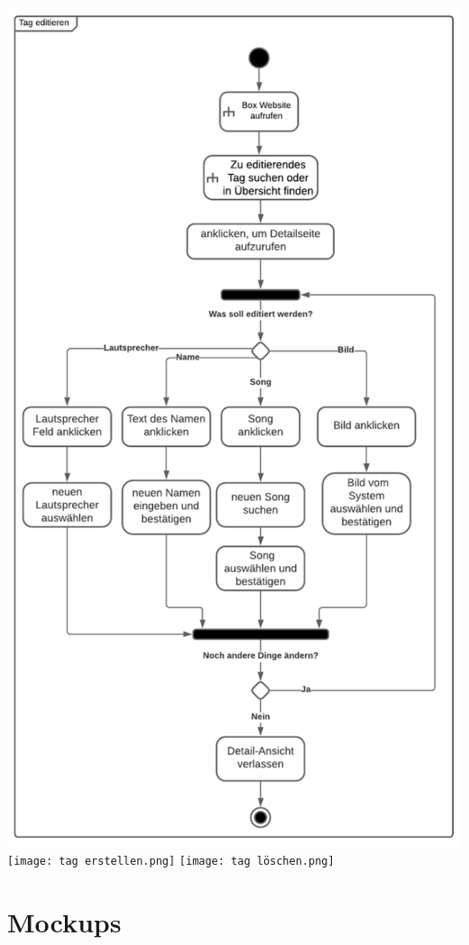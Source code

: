 \documentclass[10pt, a4paper]{article}
\begin{document}
  \includegraphics[height=\textheight]{tag editieren.png}
  \newpage
  \texttt{[image: tag erstellen.png]}
  \newpage
  \texttt{[image: tag löschen.png]}


\newpage
\section{Mockups}
  \label{FigmaDesigns}
\end{document}
